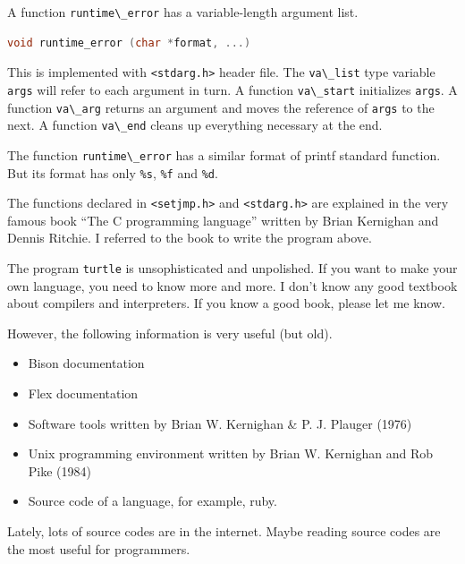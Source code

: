 A function \passthrough{\lstinline!runtime\_error!} has a
variable-length argument list.

\begin{lstlisting}[language=C]
void runtime_error (char *format, ...)
\end{lstlisting}

This is implemented with \passthrough{\lstinline!<stdarg.h>!} header
file. The \passthrough{\lstinline!va\_list!} type variable
\passthrough{\lstinline!args!} will refer to each argument in turn. A
function \passthrough{\lstinline!va\_start!} initializes
\passthrough{\lstinline!args!}. A function
\passthrough{\lstinline!va\_arg!} returns an argument and moves the
reference of \passthrough{\lstinline!args!} to the next. A function
\passthrough{\lstinline!va\_end!} cleans up everything necessary at the
end.

The function \passthrough{\lstinline!runtime\_error!} has a similar
format of printf standard function. But its format has only
\passthrough{\lstinline!\%s!}, \passthrough{\lstinline!\%f!} and
\passthrough{\lstinline!\%d!}.

The functions declared in \passthrough{\lstinline!<setjmp.h>!} and
\passthrough{\lstinline!<stdarg.h>!} are explained in the very famous
book ``The C programming language'' written by Brian Kernighan and
Dennis Ritchie. I referred to the book to write the program above.

The program \passthrough{\lstinline!turtle!} is unsophisticated and
unpolished. If you want to make your own language, you need to know more
and more. I don't know any good textbook about compilers and
interpreters. If you know a good book, please let me know.

However, the following information is very useful (but old).

\begin{itemize}
\tightlist
\item
  Bison documentation
\item
  Flex documentation
\item
  Software tools written by Brian W. Kernighan \& P. J. Plauger (1976)
\item
  Unix programming environment written by Brian W. Kernighan and Rob
  Pike (1984)
\item
  Source code of a language, for example, ruby.
\end{itemize}

Lately, lots of source codes are in the internet. Maybe reading source
codes are the most useful for programmers.
